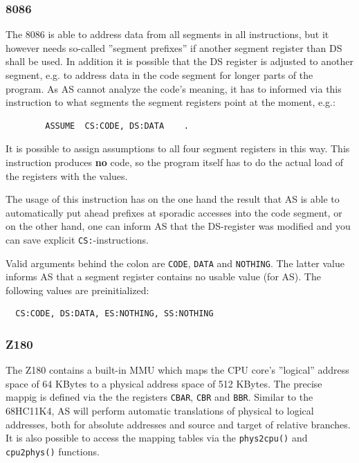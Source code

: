 \documentclass[12pt,twoside]{report}
\newcommand{\bb}[1]{{\bf #1}}
\newcommand{\tty}[1]{{\tt #1}}
\newcommand{\asname}{{AS}}
\begin{document}

\subsubsection{8086}

The 8086 is able to address data from all segments in all
instructions, but it however needs so-called ''segment prefixes'' if
another segment register than DS shall be used.  In addition it is
possible that the DS register is adjusted to another segment, e.g. to
address data in the code segment for longer parts of the program.  As
\asname{} cannot analyze the code's meaning, it has to informed via this
instruction to what segments the segment registers point at the
moment, e.g.:
\begin{verbatim}
        ASSUME  CS:CODE, DS:DATA    .
\end{verbatim}
It is possible to assign assumptions to all four segment registers in
this way.  This instruction produces \bb{no} code, so the program itself
has to do the actual load of the registers with the values.

The usage of this instruction has on the one hand the result that \asname{} is
able to automatically put ahead prefixes at sporadic accesses into the
code segment, or on the other hand, one can inform \asname{} that the DS-register
was modified and you can save explicit \tty{CS:}-instructions.

Valid arguments behind the colon are \tty{CODE}, \tty{DATA} and
\tty{NOTHING}.  The latter value informs \asname{} that a segment register
contains no usable value (for \asname{}).  The following values are
preinitialized:
\begin{verbatim}
  CS:CODE, DS:DATA, ES:NOTHING, SS:NOTHING
\end{verbatim}


\subsubsection{Z180}

The Z180 contains a built-in MMU which maps the CPU core's ''logical''
address space of 64 KBytes to a physical address space of 512 KBytes.  The
precise mappig is defined via the the registers {\tt CBAR}, {\tt CBR} and
{\tt BBR}.  Similar to the 68HC11K4, \asname{} will perform automatic
translations of physical to logical addresses, both for absolute addresses
and source and target of relative branches.  It is also possible to access
the mapping tables via the {\tt phys2cpu()} and {\tt cpu2phys()} functions.
\end{document}
